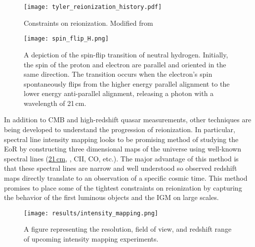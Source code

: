 \begin{figure}[th]
	\centering
	\texttt{[image: tyler\_reionization\_history.pdf]}
	\caption[Reionization Constraints]{Constraints on reionization. Modified from \cite{2019arXiv191103499W}}
	\label{fig:reionization_constraints}
\end{figure}


\begin{figure}[th]
	\centering
	\texttt{[image: spin\_flip\_H.png]}
	\caption[Spin-Flip Transition of Neutral Hydrogen]{A depiction of the spin-flip transition of neutral hydrogen. Initially,
																					 the spin of the proton and electron are parallel and oriented
																					 in the same direction. The transition occurs when the electron's spin spontaneously
																					 flips from the higher energy parallel alignment to the lower energy anti-parallel alignment,
																					 releasing a photon with a wavelength of 21\,cm.}
	\label{fig:spin_flip}
\end{figure}

In addition to CMB and high-redshift quasar measurements, other techniques are being
developed to understand the progression of reionization. In particular, spectral line
intensity mapping looks to be promising method of studying the EoR by constructing
three dimensional maps of the universe using well-known spectral lines
(\hyperref[fig:spin_flip]{21\,cm}, \lya, CII, CO, etc.). The major advantage
of this method is that these spectral lines are narrow and well understood so observed redshift
maps directly translate to an observation of a specific cosmic time. This
method promises to place some of the tightest constraints on reionization by capturing
the behavior of the first luminous objects and the IGM on large scales.

\begin{figure}[th]
	\centering
	\texttt{[image: results/intensity\_mapping.png]}
	\caption[Redshift and Resolution Coverage of Intensity Mapping Experiments]{A figure
					representing the resolution, field of view, and redshift range of upcoming intensity mapping
					experiments.}
	\label{fig:intensity_mapping}
\end{figure}
